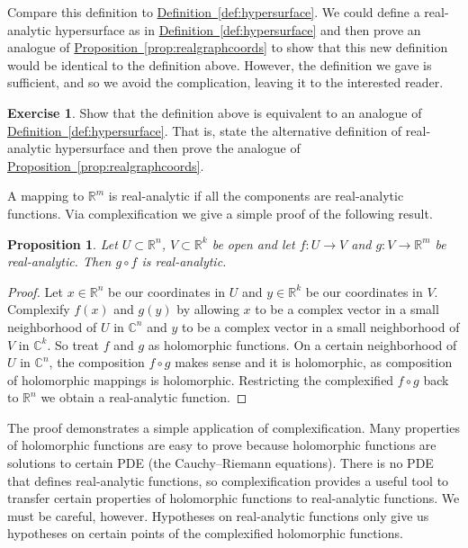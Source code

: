 \documentclass[12pt,openany]{book}
\newcommand{\C}{{\mathbb{C}}}
\newcommand{\R}{{\mathbb{R}}}
\theoremstyle{plain}
\newtheorem{prop}[thm]{Proposition}
\theoremstyle{remark}
\theoremstyle{definition}
\newenvironment{exbox}{%
    \def\FrameCommand{\vrule width 1pt \relax\hspace{10pt}}%
    \MakeFramed{\advance\hsize-\width\FrameRestore}%
}{%
    \endMakeFramed
}
\theoremstyle{exercise}
\newtheorem{exercise}{Exercise}[section]
\theoremstyle{example}
\newcommand{\propref}[1]{\hyperref[#1]{Proposition~\ref*{#1}}}
\newcommand{\defnref}[1]{\hyperref[#1]{Definition~\ref*{#1}}}
\begin{document}
Compare this definition to \defnref{def:hypersurface}.  We could
define a real-analytic hypersurface as in
\defnref{def:hypersurface} and then prove an analogue of
\propref{prop:realgraphcoords} to show that this new definition
would be identical to the definition above.
However, the definition we gave is sufficient, and so we avoid
the complication, leaving it to the interested reader.

\begin{exbox}
\begin{exercise}
Show that the definition above is equivalent to an analogue of
\defnref{def:hypersurface}.  That is, state the alternative definition of
real-analytic hypersurface and then prove the analogue of
\propref{prop:realgraphcoords}.
\end{exercise}
\end{exbox}

A mapping to $\R^m$ is real-analytic if all the components are real-analytic
functions.  Via complexification we give a simple proof of the following
result.

\begin{prop}
Let $U \subset \R^n$, $V \subset \R^k$ be open and let
$f \colon U \to V$ and $g \colon V \to \R^m$ be real-analytic.
Then $g \circ f$ is real-analytic.
\end{prop}

\begin{proof}
Let $x \in \R^n$ be our coordinates in $U$ and $y \in \R^k$ be
our coordinates in $V$.  Complexify $f(x)$ and $g(y)$ by
allowing $x$ to be a complex vector in a small neighborhood of $U$ in
$\C^n$
and $y$ to be a complex vector in a small neighborhood of $V$ in $\C^k$.
So treat $f$ and $g$ as holomorphic functions.  On a certain
neighborhood of $U$ in $\C^n$, the composition $f \circ g$ makes sense
and it is holomorphic, as composition of holomorphic mappings is holomorphic.
Restricting the complexified $f \circ g$ back to $\R^n$ we obtain a
real-analytic function.
\end{proof}

The proof demonstrates a simple application of complexification.  Many
properties of holomorphic functions are easy to prove because
holomorphic functions are solutions to certain PDE (the Cauchy--Riemann
equations).  There is no PDE
that defines real-analytic functions, so complexification provides a useful
tool to transfer certain properties of holomorphic functions to
real-analytic functions.  We must be careful, however.  Hypotheses on
real-analytic functions only give us hypotheses on certain points of the
complexified holomorphic functions.
\end{document}
